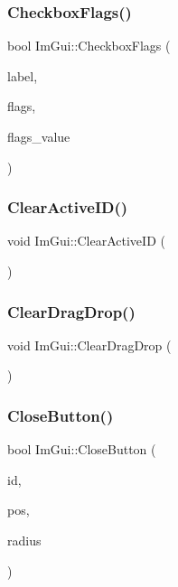 \subsubsection{\texorpdfstring{Checkbox\+Flags()}{CheckboxFlags()}}
{\footnotesize\ttfamily bool Im\+Gui\+::\+Checkbox\+Flags (\begin{DoxyParamCaption}\item[{const char $\ast$}]{label,  }\item[{unsigned int $\ast$}]{flags,  }\item[{unsigned int}]{flags\+\_\+value }\end{DoxyParamCaption})}

\hypertarget{namespace_im_gui_a17ff60ad1e2669130ac38a04d16eb354}{}\label{namespace_im_gui_a17ff60ad1e2669130ac38a04d16eb354} 
\subsubsection{\texorpdfstring{Clear\+Active\+I\+D()}{ClearActiveID()}}
{\footnotesize\ttfamily void Im\+Gui\+::\+Clear\+Active\+ID (\begin{DoxyParamCaption}{ }\end{DoxyParamCaption})}

\hypertarget{namespace_im_gui_adae8f94649956a2a717c00dbf81a5df9}{}\label{namespace_im_gui_adae8f94649956a2a717c00dbf81a5df9} 
\subsubsection{\texorpdfstring{Clear\+Drag\+Drop()}{ClearDragDrop()}}
{\footnotesize\ttfamily void Im\+Gui\+::\+Clear\+Drag\+Drop (\begin{DoxyParamCaption}{ }\end{DoxyParamCaption})}

\hypertarget{namespace_im_gui_a5e8e4df6418dcda3c4c5d15ecdf7d968}{}\label{namespace_im_gui_a5e8e4df6418dcda3c4c5d15ecdf7d968} 
\subsubsection{\texorpdfstring{Close\+Button()}{CloseButton()}}
{\footnotesize\ttfamily bool Im\+Gui\+::\+Close\+Button (\begin{DoxyParamCaption}\item[{Im\+Gui\+ID}]{id,  }\item[{const \hyperlink{struct_im_vec2}{Im\+Vec2} \&}]{pos,  }\item[{float}]{radius }\end{DoxyParamCaption})}

